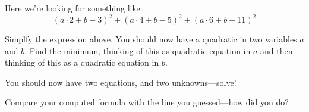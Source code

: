 \begin{teachingnote}
Here we're looking for something like:
\[
(a\cdot 2+ b -3)^2 + (a\cdot 4+ b -5)^2 + (a\cdot 6+ b -11)^2
\]
\end{teachingnote}

\begin{prob}
Simplfy the expression above. You should now have a quadratic in two
variables $a$ and $b$. Find the minimum, thinking of this as quadratic equation in $a$ and then thinking of this as a quadratic equation in $b$. 
\end{prob}

\begin{prob}
You should now have two equations, and two unknowns---solve!
\end{prob}


\begin{prob}
Compare your computed formula with the line you guessed---how did you
do?
\end{prob}
